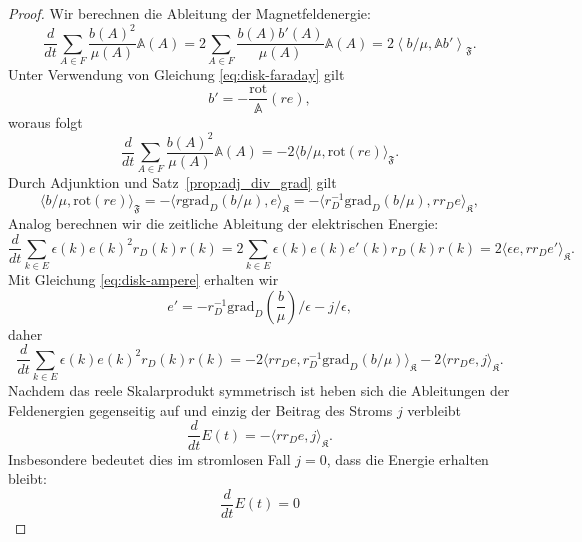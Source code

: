 \documentclass[11pt,a4paper,leqno]{report}
\numberwithin{equation}{chapter}
\begin{document}
\begin{proof}
	Wir berechnen die Ableitung der Magnetfeldenergie:
	\[
	\frac{d}{dt} \sum_{A \in F} \frac{b(A)^2}{\mu(A)}\mathbb{A}(A)  = 2 \sum_{A \in F} \frac{b(A) b'(A)}{\mu(A)}\mathbb{A}(A)  
	= 2 \left\langle b/\mu, \mathbb{A} b' \right\rangle_{\mathfrak{F}}.
	\]
	Unter Verwendung von Gleichung \eqref{eq:disk-faraday} gilt
	\[
	b'  = -\frac{\mathrm{rot}}{\mathbb{A}}(r e),
	\]
	woraus folgt
	\[
	\frac{d}{dt} \sum_{A \in F} \frac{b(A)^2}{\mu(A)}\mathbb{A}(A) = - 2 \langle b/\mu, \mathrm{rot}(r e) \rangle_{\mathfrak{F}}.
	\]
	Durch Adjunktion und Satz~\ref{prop:adj_div_grad} gilt
	\[
	\langle b/\mu, \mathrm{rot}(r e) \rangle_{\mathfrak{F}} = -\langle r \mathrm{grad}_D (b/\mu), e \rangle_{\mathfrak{K}}=-\langle r_D^{-1} \mathrm{grad}_D (b/\mu), rr_De \rangle_{\mathfrak{K}},
	\]
	Analog berechnen wir die zeitliche Ableitung der elektrischen Energie:
	\[
	\frac{d}{dt} \sum_{k \in E} \epsilon(k) e(k)^2r_D(k)r(k) = 2 \sum_{k \in E} \epsilon(k) e(k) e'(k)r_D(k)r(k) = 2 \langle \epsilon e, rr_De' \rangle_{\mathfrak{K}}.
	\]
	Mit Gleichung \eqref{eq:disk-ampere} erhalten wir
	\[
	e' = - r_D^{-1} \mathrm{grad}_D \left(\frac{b}{\mu}\right) / \epsilon - j / \epsilon,
	\]
	daher
	\[
	\frac{d}{dt} \sum_{k \in E} \epsilon(k) e(k)^2r_D(k)r(k) = - 2 \langle rr_De, r_D^{-1} \mathrm{grad}_D (b/\mu) \rangle_{\mathfrak{K}} - 2\langle rr_De, j\rangle_{\mathfrak{K}}.
	\]
	Nachdem das reele Skalarprodukt symmetrisch ist heben sich die Ableitungen der Feldenergien gegenseitig auf und einzig der Beitrag des Stroms 
	 \(j\) verbleibt
	\[
	\frac{d}{dt} E(t) = -\langle rr_De, j\rangle_{\mathfrak{K}}.
	\]
	Insbesondere bedeutet dies im stromlosen Fall \(j=0\), dass die Energie erhalten bleibt:
		\[
	\frac{d}{dt} E(t) = 0
	\]
\end{proof}
\end{document}
